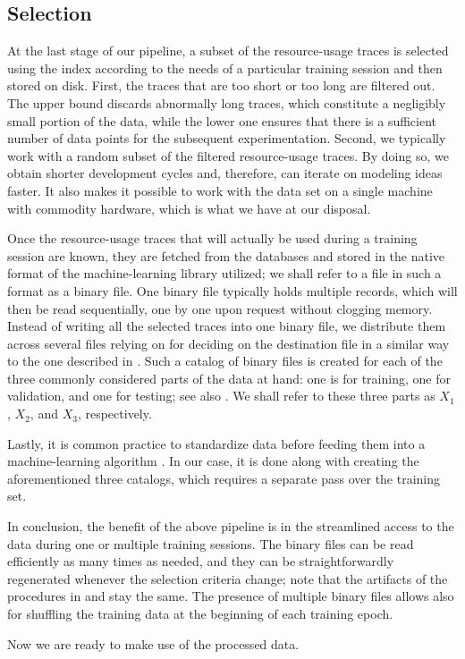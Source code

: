 \subsection{Selection} 
At the last stage of our pipeline, a subset of the resource-usage traces is
selected using the index according to the needs of a particular training session
and then stored on disk. First, the traces that are too short or too long are
filtered out. The upper bound discards abnormally long traces, which constitute
a negligibly small portion of the data, while the lower one ensures that there
is a sufficient number of data points for the subsequent experimentation.
Second, we typically work with a random subset of the filtered resource-usage
traces. By doing so, we obtain shorter development cycles and, therefore, can
iterate on modeling ideas faster. It also makes it possible to work with the
data set on a single machine with commodity hardware, which is what we have at
our disposal.

Once the resource-usage traces that will actually be used during a training
session are known, they are fetched from the databases and stored in the native
format of the machine-learning library utilized; we shall refer to a file in
such a format as a binary file. One binary file typically holds multiple
records, which will then be read sequentially, one by one upon request without
clogging memory. Instead of writing all the selected traces into one binary
file, we distribute them across several files relying on  for deciding
on the destination file in a similar way to the one described in
. Such a catalog of binary files is created for each of the three
commonly considered parts \cite{hastie2009} of the data at hand: one is for
training, one for validation, and one for testing; see also . We
shall refer to these three parts as $X_1$, $X_2$, and $X_3$, respectively.

Lastly, it is common practice to standardize data before feeding them into a
machine-learning algorithm \cite{hastie2009}. In our case, it is done along with
creating the aforementioned three catalogs, which requires a separate pass over
the training set.

In conclusion, the benefit of the above pipeline is in the streamlined access to
the data during one or multiple training sessions. The binary files can be read
efficiently as many times as needed, and they can be straightforwardly
regenerated whenever the selection criteria change; note that the artifacts of
the procedures in  and  stay the same. The
presence of multiple binary files allows also for shuffling the training data at
the beginning of each training epoch.

Now we are ready to make use of the processed data.
